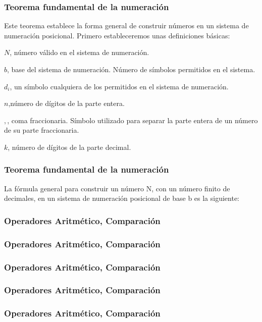 \documentclass{beamer}
\begin{document}
\begin{frame}
\frametitle{Teorema fundamental de la numeración}

Este teorema establece la forma general de construir números en un sistema de numeración posicional. Primero estableceremos 
unas definiciones básicas:

$N$, número válido en el sistema de numeración.

$b$, base del sistema de numeración. Número de símbolos permitidos en el sistema.

$d_{i}$, un símbolo cualquiera de los permitidos en el sistema de numeración.

$n$,número de dígitos de la parte entera.

$,$, coma fraccionaria. Símbolo utilizado para separar la parte entera de un número de su parte fraccionaria.

$k$, número de dígitos de la parte decimal.

\end{frame}

\begin{frame}
\frametitle{Teorema fundamental de la numeración}

La fórmula general para construir un número N, con un número finito de decimales, en un sistema de numeración posicional de 
base b es la siguiente:



\end{frame}

\begin{frame}
\frametitle{Operadores Aritmético, Comparación}

\end{frame}

\begin{frame}
\frametitle{Operadores Aritmético, Comparación}

\end{frame}

\begin{frame}
\frametitle{Operadores Aritmético, Comparación}

\end{frame}

\begin{frame}
\frametitle{Operadores Aritmético, Comparación}

\end{frame}

\begin{frame}
\frametitle{Operadores Aritmético, Comparación}

\end{frame}
\end{document}
